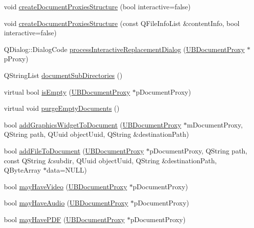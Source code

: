 \begin{DoxyCompactItemize}
\item 
void \hyperlink{class_u_b_persistence_manager_a8bc8f263d576ad0d4735bcd09fcff4ad}{create\-Document\-Proxies\-Structure} (bool interactive=false)
\item 
void \hyperlink{class_u_b_persistence_manager_aa00b9d2c95e5524c6017f05259cb93dc}{create\-Document\-Proxies\-Structure} (const Q\-File\-Info\-List \&content\-Info, bool interactive=false)
\item 
Q\-Dialog\-::\-Dialog\-Code \hyperlink{class_u_b_persistence_manager_ad6d143e614a8c749dd193087b63fb8d0}{process\-Interactive\-Replacement\-Dialog} (\hyperlink{class_u_b_document_proxy}{U\-B\-Document\-Proxy} $\ast$p\-Proxy)
\item 
Q\-String\-List \hyperlink{class_u_b_persistence_manager_ad81fe5639a1a8bab6a779f78158e4d33}{document\-Sub\-Directories} ()
\item 
virtual bool \hyperlink{class_u_b_persistence_manager_aed7b170dda1a9b6a4e29d37e5cd41ce4}{is\-Empty} (\hyperlink{class_u_b_document_proxy}{U\-B\-Document\-Proxy} $\ast$p\-Document\-Proxy)
\item 
virtual void \hyperlink{class_u_b_persistence_manager_a2d3ecf90c9dba3cd79c5c36156278b85}{purge\-Empty\-Documents} ()
\item 
bool \hyperlink{class_u_b_persistence_manager_aecba1556fd7a0608c8a183f1104721c2}{add\-Graphics\-Widget\-To\-Document} (\hyperlink{class_u_b_document_proxy}{U\-B\-Document\-Proxy} $\ast$m\-Document\-Proxy, Q\-String path, Q\-Uuid object\-Uuid, Q\-String \&destination\-Path)
\item 
bool \hyperlink{class_u_b_persistence_manager_acd23e0a499945e39b27cf663f0236ce1}{add\-File\-To\-Document} (\hyperlink{class_u_b_document_proxy}{U\-B\-Document\-Proxy} $\ast$p\-Document\-Proxy, Q\-String path, const Q\-String \&subdir, Q\-Uuid object\-Uuid, Q\-String \&destination\-Path, Q\-Byte\-Array $\ast$data=N\-U\-L\-L)
\item 
bool \hyperlink{class_u_b_persistence_manager_aa95ab0380bb515e3ab7ef24f4edb7999}{may\-Have\-Video} (\hyperlink{class_u_b_document_proxy}{U\-B\-Document\-Proxy} $\ast$p\-Document\-Proxy)
\item 
bool \hyperlink{class_u_b_persistence_manager_a2024fa073874438098f0a5bd2ba93928}{may\-Have\-Audio} (\hyperlink{class_u_b_document_proxy}{U\-B\-Document\-Proxy} $\ast$p\-Document\-Proxy)
\item 
bool \hyperlink{class_u_b_persistence_manager_a77fb7cc43d3533e558d43bbefe375135}{may\-Have\-P\-D\-F} (\hyperlink{class_u_b_document_proxy}{U\-B\-Document\-Proxy} $\ast$p\-Document\-Proxy)

\end{DoxyCompactItemize}
